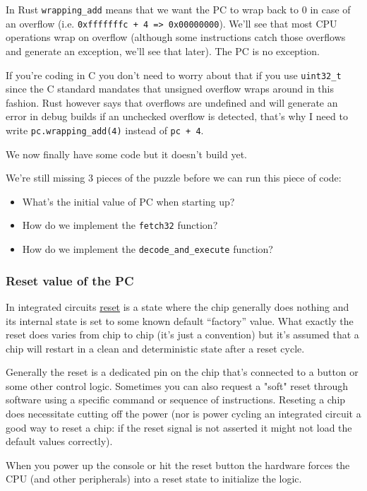 \documentclass[a4paper]{article}
\newcommand{\code}[1] {\texttt{#1}}
\begin{document}
In Rust \code{wrapping\_add} means that we want the PC to
wrap back to 0 in case of an overflow (i.e. \code{0xfffffffc + 4 =>
0x00000000}). We'll see that most CPU operations wrap on overflow
(although some instructions catch those overflows and generate an
exception, we'll see that later). The PC is no exception.

If you're coding in C you don't need to worry about that if you use
\code{uint32\_t} since the C standard mandates that unsigned overflow wraps
around in this fashion. Rust however says that overflows are undefined
and will generate an error in debug builds if an unchecked overflow is
detected, that's why I need to write \code{pc.wrapping\_add(4)} instead of
\code{pc + 4}.

We now finally have some code but it doesn't build yet.

We're still missing 3 pieces of the puzzle before we can run this
piece of code:

\begin{itemize}
 \item What's the initial value of PC when starting up?
 \item How do we implement the \code{fetch32} function?
 \item How do we implement the \code{decode\_and\_execute} function?
\end{itemize}

\subsubsection{Reset value of the PC}

In integrated circuits
\href{https://en.wikipedia.org/wiki/Reset_%28computing%29}{reset} is a
state where the chip generally does nothing and its internal state
is set to some known default ``factory'' value. What exactly the
reset does varies from chip to chip (it's just a convention) but
it's assumed that a chip will restart in a clean and deterministic
state after a reset cycle.

Generally the reset is a dedicated pin on the chip that's connected to
a button or some other control logic. Sometimes you can also request a
"soft" reset through software using a specific command or sequence of
instructions. Reseting a chip does necessitate cutting off the power
(nor is power cycling an integrated circuit a good way to reset a
chip: if the reset signal is not asserted it might not load the
default values correctly).

When you power up the console or hit the reset button the hardware
forces the CPU (and other peripherals) into a reset state to
initialize the logic.
\end{document}
